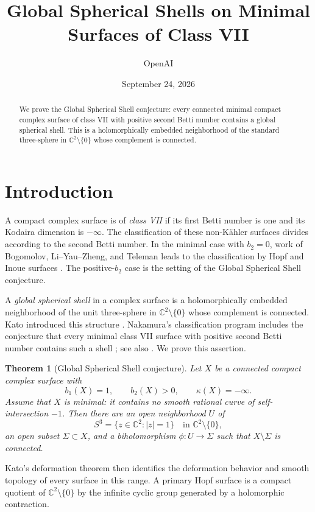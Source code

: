 \documentclass[11pt]{article}
\title{Global Spherical Shells on Minimal Surfaces of Class VII}
\author{OpenAI}
\date{September 24, 2026}
\numberwithin{equation}{section}
\newtheorem{theorem}{Theorem}[section]
\theoremstyle{definition}
\theoremstyle{remark}
\newcommand{\CC}{\mathbb C}
\begin{document}
\maketitle

\begin{abstract}
We prove the Global Spherical Shell conjecture: every connected minimal
compact complex surface of class VII with positive second Betti number
contains a global spherical shell. This is a holomorphically embedded
neighborhood of the standard three-sphere in $\CC^2\setminus\{0\}$
whose complement is connected.
\end{abstract}

\section{Introduction}

A compact complex surface is of \emph{class VII} if its first Betti
number is one and its Kodaira dimension is $-\infty$. The classification
of these non-K\"ahler surfaces divides according to the second Betti
number. In the minimal case with $b_2=0$, work of Bogomolov,
Li--Yau--Zheng, and Teleman leads to the classification by Hopf and
Inoue surfaces \cite{Bogomolov1976,LiYauZheng1994,Teleman1994}.
The positive-$b_2$ case is the setting of the Global Spherical Shell
conjecture.

A \emph{global spherical shell} in a complex surface is a holomorphically
embedded neighborhood of the unit three-sphere in $\CC^2\setminus\{0\}$
whose complement is connected. Kato introduced this structure
\cite{Kato1977}. Nakamura's classification program includes the
conjecture that every minimal class VII surface with positive second
Betti number contains such a shell
\cite[Working Hypothesis~5.5]{Nakamura1984}; see also
\cite{Nakamura1989,Teleman2010}. We prove this assertion.

\begin{theorem}[Global Spherical Shell conjecture]\label{thm:main}
Let $X$ be a connected compact complex surface with
\[
 b_1(X)=1,\qquad b_2(X)>0,\qquad \kappa(X)=-\infty.
\]
Assume that $X$ is minimal: it contains no smooth rational curve of
self-intersection $-1$. Then there are an open neighborhood $U$ of
\[
 S^3=\{z\in\CC^2:|z|=1\}
 \quad\text{in }\CC^2\setminus\{0\},
\]
an open subset $\Sigma\subset X$, and a biholomorphism
$\phi:U\longrightarrow\Sigma$ such that $X\setminus\Sigma$ is connected.
\end{theorem}

Kato's deformation theorem then identifies the deformation behavior and
smooth topology of every surface in this range. A primary Hopf surface
is a compact quotient of $\CC^2\setminus\{0\}$ by the infinite cyclic
group generated by a holomorphic contraction.
\end{document}
